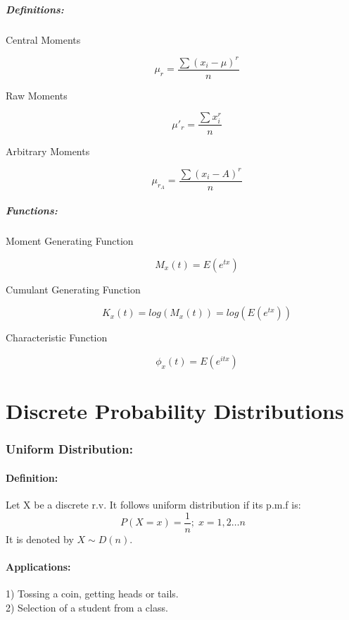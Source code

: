 \documentclass[
10pt, %
a4paper, %
]{report}
\begin{document}
\subsubsection*{Definitions:}
\begin{description}
  \item[Central Moments]
    \[
    \mu_r = \frac{\sum(x_i-\mu)^r}{n}
    \]
  \item[Raw Moments]
    \[
    \mu'_r = \frac{\sum x_i^r}{n}
    \]
  \item[Arbitrary Moments]
    \[
    \mu_{r_A} = \frac{\sum(x_i-A)^r}{n}
    \]
    
\end{description}

\subsubsection*{Functions:}
\begin{description}
  \item[Moment Generating Function]
    \[
    M_x(t) = E(e^{tx})
    \]
  \item[Cumulant Generating Function]
    \[
    K_x(t) = log(M_x(t)) = log(E(e^{tx}))
    \]
  \item[Characteristic Function ]
    \[
    \phi_x(t) = E(e^{itx})
    \]
    
\end{description}

\part{Discrete Probability Distributions}

\section*{Uniform Distribution:}
\subsection*{Definition:}
Let X be a discrete r.v. It follows uniform distribution if its p.m.f is:
\[P(X=x)=\frac{1}{n};\; x=1, 2\dots n\] 
It is denoted by \(X \sim D(n).\)

\subsection*{Applications:}
1) Tossing a coin, getting heads or tails. \\
2) Selection of a student from a class.
\end{document}
